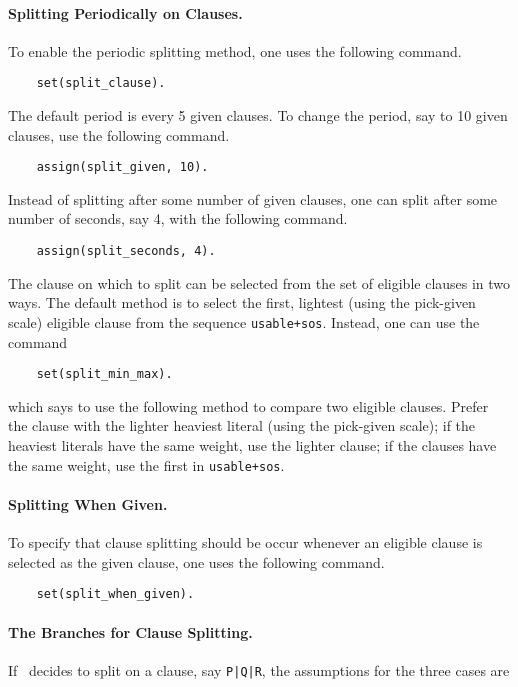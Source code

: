 \documentclass[11pt]{article}
\begin{document}
\paragraph{Splitting Periodically on Clauses.}  To enable the periodic
splitting method, one uses the following command.

{\small
\begin{verbatim}
    set(split_clause).
\end{verbatim}
}
\noindent
The default period is every 5 given clauses.  To change the period,
say to 10 given clauses, use the following command.

{\small
\begin{verbatim}
    assign(split_given, 10).
\end{verbatim}
}
\noindent
Instead of splitting after some number of given clauses, one
can split after some number of seconds, say 4, with the following command.

{\small
\begin{verbatim}
    assign(split_seconds, 4).
\end{verbatim}
}
\noindent
The clause on which to split can be selected from the set of eligible
clauses in two ways.  The default method is to select the first, lightest
(using the pick-given scale) eligible clause from the sequence
\verb:usable+sos:.  Instead, one can use the command

{\small
\begin{verbatim}
    set(split_min_max).
\end{verbatim}
}
\noindent
which says to use the following method to compare two eligible clauses.
Prefer the clause with the lighter heaviest literal
(using the pick-given scale);  if the heaviest literals have the same
weight, use the lighter clause;  if the clauses have the same
weight, use the first in \verb:usable+sos:.

\paragraph{Splitting When Given.}  To specify that clause splitting should
be occur whenever an eligible clause is selected as the given clause, one uses
the following command.

{\small
\begin{verbatim}
    set(split_when_given).
\end{verbatim}
}

\paragraph{The Branches for Clause Splitting.}
If \otter\ decides to split on a clause, say \verb:P|Q|R:,
the assumptions for the three cases are
\end{document}
